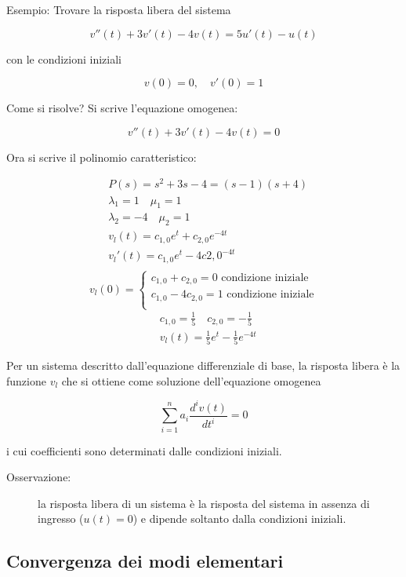 \documentclass[a4paper, 12pt]{book}
\theoremstyle{plain}
\begin{document}
Esempio: Trovare la risposta libera del sistema

\[
    v''(t) + 3v'(t) - 4v(t) = 5u'(t) - u(t)
\]

con le condizioni iniziali

\[
    v(0) = 0, \quad v'(0) = 1
\]

Come si risolve? Si scrive l'equazione omogenea:

\[
    v''(t) + 3v'(t) - 4v(t) = 0
\]

Ora si scrive il polinomio caratteristico:

\[
    \begin{split}
        &P(s) = s^2 + 3s - 4 = (s - 1)(s + 4) \\
        &\lambda_1 = 1 \quad \mu_1 = 1 \\
        &\lambda_2 = -4 \quad \mu_2 = 1 \\
        &v_l(t) = c_{1,0} e^t + c_{2,0} e^{-4t} \\
        &v_l'(t) = c_{1,0} e^t - 4c{2,0}^{-4t} \\
    \end{split}
\]
\[
v_l(0) =
    \begin{cases}
        c_{1,0} + c_{2,0} = 0 \textrm{ condizione iniziale} \\
        c_{1,0} - 4c_{2,0} = 1 \textrm{ condizione iniziale} \\
    \end{cases}
\]
\[
    \begin{split}
        &c_{1,0} = \frac{1}{5} \quad c_{2,0} = -\frac{1}{5} \\
        &v_l(t) = \frac{1}{5} e^t - \frac{1}{5} e^{-4t}
    \end{split}
\]

Per un sistema descritto dall'equazione differenziale di base, la risposta libera è la funzione $v_l$ che si ottiene come 
soluzione dell'equazione omogenea 

\[
    \sum_{i = 1}^n a_i \frac{d^iv(t)}{dt^i} = 0
\]

i cui coefficienti sono determinati dalle condizioni iniziali.

\begin{description}
    \item[Osservazione:] la risposta libera di un sistema è la risposta del sistema in assenza di ingresso ($u(t) = 0$) e dipende soltanto dalla condizioni iniziali.
\end{description}

\subsection{Convergenza dei modi elementari}
\end{document}

